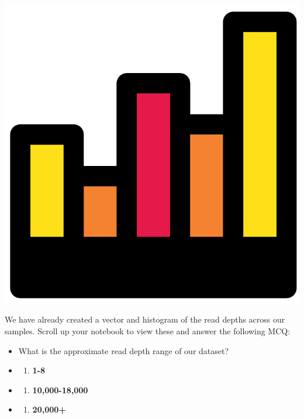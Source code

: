 \documentclass[
]{book}
\providecommand{\tightlist}{%
  \setlength{\itemsep}{0pt}\setlength{\parskip}{0pt}}
\begin{document}
\includegraphics{figures/histogram.png}

We have already created a vector and histogram of the read depths across our samples. Scroll up your notebook to view these and answer the following MCQ:

\begin{itemize}
\item
  What is the approximate read depth range of our dataset?
\item
  \begin{enumerate}
  \def\labelenumi{(\Alph{enumi})}
  \tightlist
  \item
    \textbf{1-8}\\
  \end{enumerate}
\item
  \begin{enumerate}
  \def\labelenumi{(\Alph{enumi})}
  \setcounter{enumi}{1}
  \tightlist
  \item
    \textbf{10,000-18,000}\\
  \end{enumerate}
\item
  \begin{enumerate}
  \def\labelenumi{(\Alph{enumi})}
  \setcounter{enumi}{2}
  \tightlist
  \item
    \textbf{20,000+}
  \end{enumerate}
\end{itemize}
\end{document}
